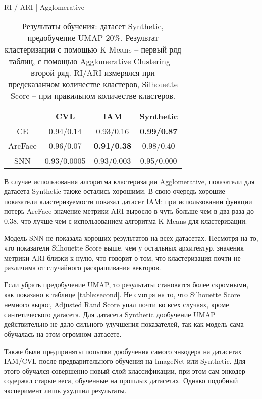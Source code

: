\begin{table}[ht]
{        \hfill
        \begin{subtable}{0.4\linewidth}
            \centering
            \caption{RI / ARI | Agglomerative}
            \begin{tabular}{|c|c|c|c|}
            \hline
                & CVL & IAM & Synthetic \\
            \hline
            CE & 0.94/0.14 & 0.93/0.16 & \textbf{0.99/0.87} \\
            ArcFace & 0.96/0.07 & \textbf{0.91/0.38} & 0.98/0.40 \\
            SNN & 0.93/0.0005 & 0.93/0.003 & 0.95/0.000 \\
            \hline
            \end{tabular}
        \end{subtable}
    }
    
    \caption{Результаты обучения: датасет Synthetic, предобучение UMAP 20\%. Результат кластеризации с помощью K-Means -- первый ряд таблиц, с помощью Agglomerative Clustering -- второй ряд. RI/ARI измерялся при предсказанном количестве кластеров, Silhouette Score -- при правильном количестве кластеров.}

    \label{table:first}
\end{table}

В случае использования алгоритма кластеризации Agglomerative, показатели для датасета Synthetic также остались хорошими. В свою очередь хорошие показатели кластеризуемости показал датасет IAM: при использовании функции потерь ArcFace значение метрики ARI выросло в чуть больше чем в два раза до 0.38, что лучше чем с использованием алгоритма K-Means для кластеризации.

Модель SNN не показала хороших результатов на всех датасетах. Несмотря на то, что показатели Silhouette Score выше, чем у остальных архитектур, значения метрики ARI близки к нулю, что говорит о том, что кластеризация почти не различима от случайного раскрашивания векторов.

Если убрать предобучение UMAP, то результаты становятся более скромными, как показано в таблице \ref{table:second}. Не смотря на то, что Silhouette Score немного вырос, Adjusted Rand Score упал почти во всех случаях, кроме синтетического датасета. Для датасета Synthetic дообучение UMAP действительно не дало сильного улучшения показателей, так как модель сама обучалась на этом огромном датасете.

Также были предприняты попытки дообучения самого энкодера на датасетах IAM/CVL после предварительного обучения на ImageNet или Synthetic. Для этого обучался совершенно новый слой классификации, при этом сам энкодер содержал старые веса, обученные на прошлых датасетах. Однако подобный эксперимент лишь ухудшил результаты.

